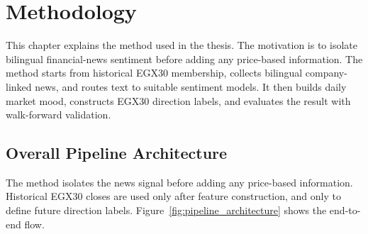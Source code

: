 \chapter{Methodology}
\label{chap:methodology}

This chapter explains the method used in the thesis. The motivation is to isolate bilingual financial-news sentiment before adding any price-based information. The method starts from historical EGX30 membership, collects bilingual company-linked news, and routes text to suitable sentiment models. It then builds daily market mood, constructs EGX30 direction labels, and evaluates the result with walk-forward validation.

\section{Overall Pipeline Architecture}

The method isolates the news signal before adding any price-based information. Historical EGX30 closes are used only after feature construction, and only to define future direction labels. Figure~\ref{fig:pipeline_architecture} shows the end-to-end flow.

